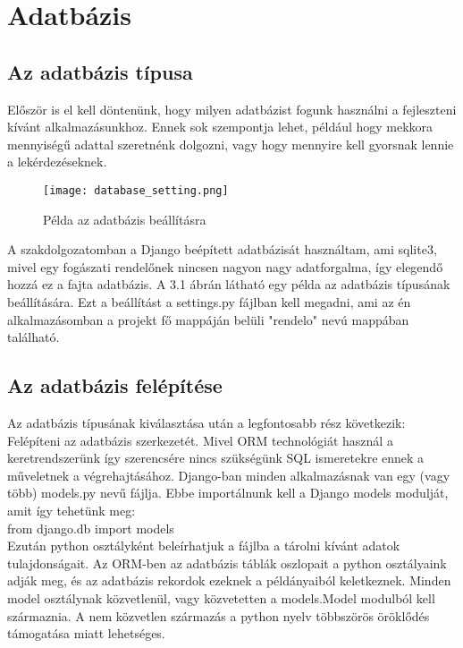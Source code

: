 \chapter{Adatbázis}
\label{chap:fejezet3}

\section{Az adatbázis típusa}
Először is el kell döntenünk, hogy milyen adatbázist fogunk használni a fejleszteni kívánt alkalmazásunkhoz. Ennek sok szempontja lehet, például hogy mekkora mennyiségű adattal szeretnénk dolgozni, vagy hogy mennyire kell gyorsnak lennie a lekérdezéseknek.

\begin{figure}[!htbp]
	\caption{Példa az adatbázis beállításra}
	\label{fig:adatbazisbeallitas}
	\centering
	\texttt{[image: database\_setting.png]}
\end{figure}

A szakdolgozatomban a Django beépített adatbázisát használtam, ami sqlite3, mivel egy fogászati rendelőnek nincsen nagyon nagy adatforgalma, így elegendő hozzá ez a fajta adatbázis. A 3.1 ábrán látható egy példa az adatbázis típusának beállítására. Ezt a beállítást a settings.py fájlban kell megadni, ami az én alkalmazásomban a projekt fő mappáján belüli "rendelo" nevú mappában található.

\section{Az adatbázis felépítése}
Az adatbázis típusának kiválasztása után a legfontosabb rész következik: Felépíteni az adatbázis szerkezetét. Mivel ORM technológiát használ a keretrendszerünk így szerencsére nincs szükségünk SQL ismeretekre ennek a műveletnek a végrehajtásához. Django-ban minden alkalmazásnak van egy (vagy több) models.py nevű fájlja. Ebbe importálnunk kell a Django models modulját, amit így tehetünk meg:\\
from django.db import models\\
Ezután python osztályként beleírhatjuk a fájlba a tárolni kívánt adatok tulajdonságait. Az ORM-ben az adatbázis táblák oszlopait a python osztályaink adják meg, és az adatbázis rekordok ezeknek a példányaiból keletkeznek. Minden model osztálynak közvetlenül, vagy közvetetten a models.Model modulból kell származnia. A nem közvetlen származás a python nyelv többszörös öröklődés támogatása miatt lehetséges.


